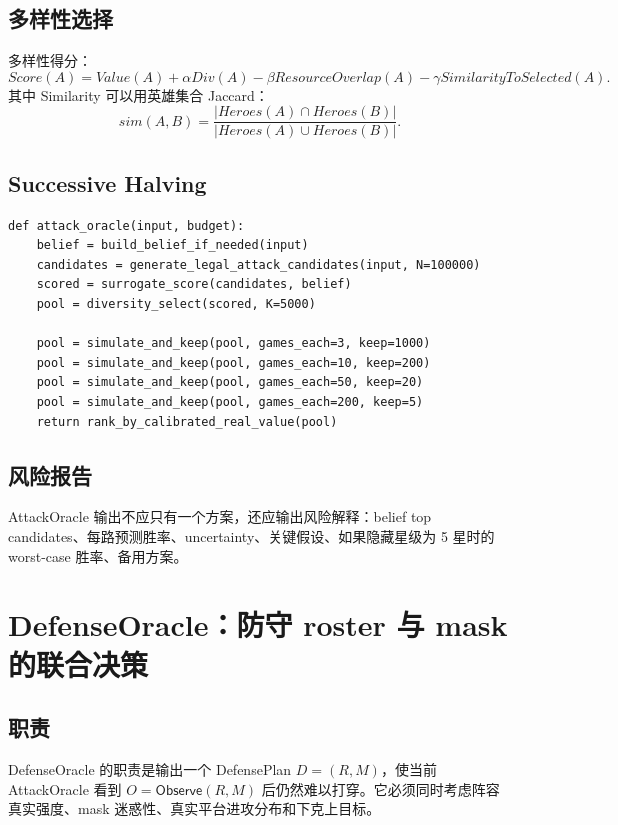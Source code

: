 \documentclass[UTF8,12pt,openany]{ctexbook}
\newcommand{\Observe}{\mathsf{Observe}}
\begin{document}
\section{多样性选择}
多样性得分：
\begin{equation}
Score(A)=Value(A)+\alpha Div(A)-\beta ResourceOverlap(A)-\gamma SimilarityToSelected(A).
\end{equation}
其中 Similarity 可以用英雄集合 Jaccard：
\begin{equation}
sim(A,B)=\frac{|Heroes(A)\cap Heroes(B)|}{|Heroes(A)\cup Heroes(B)|}.
\end{equation}

\section{Successive Halving}
\begin{lstlisting}[caption={AttackOracle 多保真流程}]
def attack_oracle(input, budget):
    belief = build_belief_if_needed(input)
    candidates = generate_legal_attack_candidates(input, N=100000)
    scored = surrogate_score(candidates, belief)
    pool = diversity_select(scored, K=5000)

    pool = simulate_and_keep(pool, games_each=3, keep=1000)
    pool = simulate_and_keep(pool, games_each=10, keep=200)
    pool = simulate_and_keep(pool, games_each=50, keep=20)
    pool = simulate_and_keep(pool, games_each=200, keep=5)
    return rank_by_calibrated_real_value(pool)
\end{lstlisting}

\section{风险报告}
AttackOracle 输出不应只有一个方案，还应输出风险解释：belief top candidates、每路预测胜率、uncertainty、关键假设、如果隐藏星级为 5 星时的 worst-case 胜率、备用方案。


\chapter{DefenseOracle：防守 roster 与 mask 的联合决策}

\section{职责}
DefenseOracle 的职责是输出一个 DefensePlan $D=(R,M)$，使当前 AttackOracle 看到 $O=\Observe(R,M)$ 后仍然难以打穿。它必须同时考虑阵容真实强度、mask 迷惑性、真实平台进攻分布和下克上目标。
\end{document}
